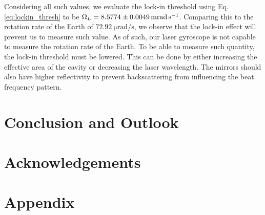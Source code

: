 \documentclass[a4paper]{report}
\numberwithin{equation}{section}
\begin{document}
Considering all such values, we evaluate the lock-in threshold using Eq. \ref{eq:lockin_thresh} to be $\Omega_L = \SI{8.5774 +- 0.0049}{\milli\radian\per\second}$. 
Comparing this to the rotation rate of the Earth of $\SI{72.92}{\micro\radian\per\second}$, we observe that the lock-in effect will 
prevent us to measure such value. As of such, our laser gyroscope is not capable to measure the rotation rate of the Earth. To be 
able to measure such quantity, the lock-in threshold must be lowered. This can be done by either increasing the effective area of 
the cavity or decreasing the laser wavelength. The mirrors should also have higher reflectivity to prevent backscattering 
from influencing the beat frequency pattern.\par 


\chapter{Conclusion and Outlook}

\chapter{Acknowledgements}

\printbibliography

\chapter{Appendix} \label{chap:appendix}

\printbibliography
\end{document}
